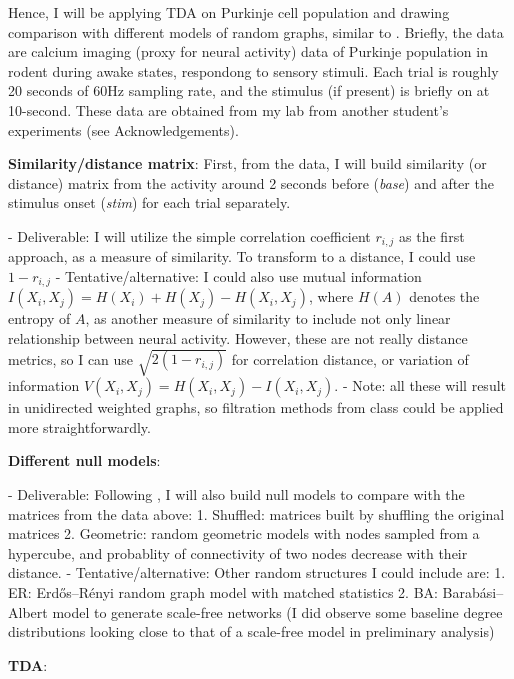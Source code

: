Hence, I will be applying TDA on Purkinje cell population and drawing comparison with different models of random graphs, similar to \cite{Giusti2015-uo}. Briefly, the data are calcium imaging (proxy for neural activity) data of Purkinje population in rodent during awake states, respondong to sensory stimuli. Each trial is roughly 20 seconds of 60Hz sampling rate, and the stimulus (if present) is briefly on at 10-second. These data are obtained from my lab from another student's experiments (see Acknowledgements).


\textbf{Similarity/distance matrix}: First, from the data, I will build similarity (or distance) matrix from the activity around 2 seconds before (\textit{base}) and after the stimulus onset (\textit{stim}) for each trial separately.

- Deliverable: I will utilize the simple correlation coefficient $r_{i,j}$ as the first approach, as a measure of similarity. To transform to a distance, I could use $1 - r_{i,j}$
- Tentative/alternative: I could also use mutual information $I(X_i,X_j) = H(X_i) + H(X_j) - H(X_i,X_j)$, where $H(A)$ denotes the entropy of $A$, as another measure of similarity to include not only linear relationship between neural activity. However, these are not really distance metrics, so I can use $\sqrt{2(1-r_{i,j})}$ for correlation distance, or variation of information $V(X_i,X_j) = H(X_i,X_j) - I(X_i,X_j)$.
- Note: all these will result in unidirected weighted graphs, so filtration methods from class could be applied more straightforwardly.

\textbf{Different null models}:

- Deliverable: Following \cite{Giusti2015-uo}, I will also build null models to compare with the matrices from the data above:
  1. Shuffled: matrices built by shuffling the original matrices
  2. Geometric: random geometric models with nodes sampled from a hypercube, and probablity of connectivity of two nodes decrease with their distance.
- Tentative/alternative: Other random structures I could include are:
  1. ER: Erdős–Rényi random graph model with matched statistics
  2. BA: Barabási–Albert model to generate scale-free networks (I did observe some baseline degree distributions looking close to that of a scale-free model in preliminary analysis)

\textbf{TDA}:

